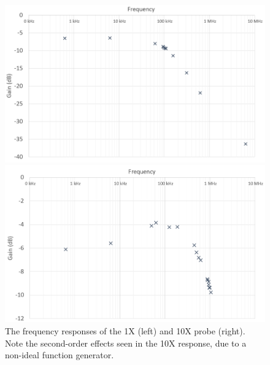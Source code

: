 \documentclass{report}
\begin{document}
\begin{figure}[H]
	\begin{minipage}{0.5\linewidth}
		\includegraphics[width=1.0\linewidth]{exp4c1x}
	\end{minipage}
	\begin{minipage}{0.5\linewidth}
		\includegraphics[width=1.0\linewidth]{exp4c10x}
	\end{minipage}
	\caption{The frequency responses of the 1X (left) and 10X probe (right). Note the second-order effects seen in the 10X response, due to a non-ideal function generator.}
	\label{fig:1c}
\end{figure}
\end{document}
